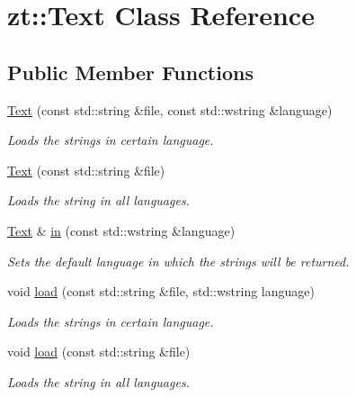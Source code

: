 \hypertarget{classzt_1_1_text}{}\section{zt\+:\+:Text Class Reference}
\label{classzt_1_1_text}
\subsection*{Public Member Functions}
\begin{DoxyCompactItemize}
\item 
\hyperlink{classzt_1_1_text_a7c2c09cf73f21a53547f761643544610}{Text} (const std\+::string \&file, const std\+::wstring \&language)
\begin{DoxyCompactList}\small\item\em Loads the strings in certain language. \end{DoxyCompactList}\item 
\mbox{\label{classzt_1_1_text_a061e7d98810ab9c2cadcd835eef99085}} 
\hyperlink{classzt_1_1_text_a061e7d98810ab9c2cadcd835eef99085}{Text} (const std\+::string \&file)
\begin{DoxyCompactList}\small\item\em Loads the string in all languages. \end{DoxyCompactList}\item 
\hyperlink{classzt_1_1_text}{Text} \& \hyperlink{classzt_1_1_text_aa1dc0e4e2fef138ead0918b9f64b9c4f}{in} (const std\+::wstring \&language)
\begin{DoxyCompactList}\small\item\em Sets the default language in which the strings will be returned. \end{DoxyCompactList}\item 
void \hyperlink{classzt_1_1_text_a7bee96c860d0c2a6157e59575cd0fc54}{load} (const std\+::string \&file, std\+::wstring language)
\begin{DoxyCompactList}\small\item\em Loads the strings in certain language. \end{DoxyCompactList}\item 
\mbox{\label{classzt_1_1_text_a10907b80ad282375f085c19601a5e1b2}} 
void \hyperlink{classzt_1_1_text_a10907b80ad282375f085c19601a5e1b2}{load} (const std\+::string \&file)
\begin{DoxyCompactList}\small\item\em Loads the string in all languages. \end{DoxyCompactList}\item 

\end{DoxyCompactItemize}
